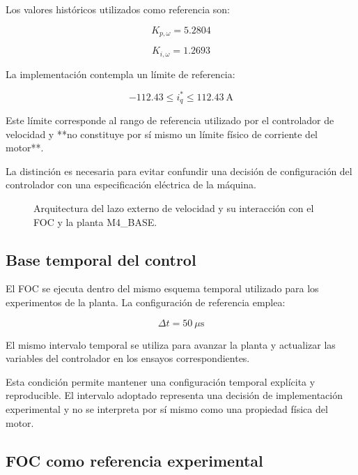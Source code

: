 Los valores históricos utilizados como referencia son:

\begin{equation}
K_{p,\omega}=5.2804
\end{equation}

\begin{equation}
K_{i,\omega}=1.2693
\end{equation}

La implementación contempla un límite de referencia:

\begin{equation}
-112.43\leq i_q^{*}\leq112.43\ \mathrm{A}
\end{equation}

Este límite corresponde al rango de referencia utilizado por el controlador de velocidad y **no constituye por sí mismo un límite físico de corriente del motor**.

La distinción es necesaria para evitar confundir una decisión de configuración del controlador con una especificación eléctrica de la máquina.


\begin{figure}[H]
\centering
\resizebox{\textwidth}{!}{%

}
\caption{Arquitectura del lazo externo de velocidad y su interacción con el FOC y la planta M4\_BASE.}
\label{fig:foc_lazo_velocidad}
\end{figure}

\subsection{Base temporal del control}

El FOC se ejecuta dentro del mismo esquema temporal utilizado para los experimentos de la planta. La configuración de referencia emplea:

\begin{equation}
\Delta t=50\ \mu\mathrm{s}
\end{equation}

El mismo intervalo temporal se utiliza para avanzar la planta y actualizar las variables del controlador en los ensayos correspondientes.

Esta condición permite mantener una configuración temporal explícita y reproducible. El intervalo adoptado representa una decisión de implementación experimental y no se interpreta por sí mismo como una propiedad física del motor.

\subsection{FOC como referencia experimental}

